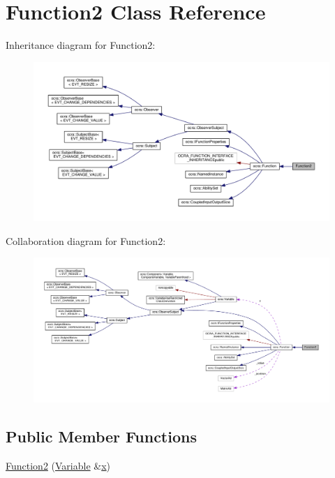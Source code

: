\hypertarget{classFunction2}{}\section{Function2 Class Reference}
\label{classFunction2}


Inheritance diagram for Function2\+:
\nopagebreak
\begin{figure}[H]
\begin{center}
\leavevmode
\includegraphics[width=350pt]{d3/dd4/classFunction2__inherit__graph}
\end{center}
\end{figure}


Collaboration diagram for Function2\+:
\nopagebreak
\begin{figure}[H]
\begin{center}
\leavevmode
\includegraphics[width=350pt]{dc/dc4/classFunction2__coll__graph}
\end{center}
\end{figure}
\subsection*{Public Member Functions}
\begin{DoxyCompactItemize}
\item 
\hyperlink{classFunction2_ad907d2408853a2d278f87293abfcdf47}{Function2} (\hyperlink{classocra_1_1Variable}{Variable} \&\hyperlink{classocra_1_1Function_a28825886d1f149c87b112ec2ec1dd486}{x})
\end{DoxyCompactItemize}
